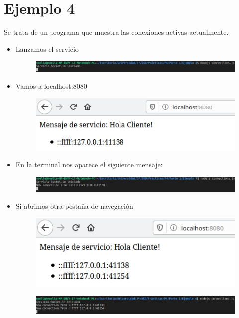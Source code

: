 \documentclass{article}
\begin{document}
	\section{Ejemplo 4}
	Se trata de un programa que muestra las conexiones activas actualmente.
	\begin{itemize}
		\item Lanzamos el servicio
		\begin{figure}[H]
			\centering
			\includegraphics[totalheight=0.7cm]{img/7.png}
		\end{figure}
		\item Vamos a localhost:8080
		\begin{figure}[H]
			\centering
			\includegraphics[totalheight=3cm]{img/8.png}
		\end{figure}
		\item En la terminal nos aparece el siguiente mensaje:
		\begin{figure}[H]
			\centering
			\includegraphics[totalheight=0.99cm]{img/9.png}
		\end{figure}
		\item Si abrimos otra pestaña de navegación
		\begin{figure}[H]
			\centering
			\includegraphics[totalheight=3cm]{img/10.png}
		\end{figure}
		\begin{figure}[H]
			\centering
			\includegraphics[totalheight=1.25cm]{img/11.png}

\end{figure}
\end{itemize}
\end{document}
